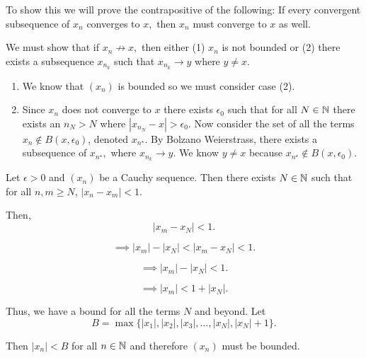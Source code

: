 \documentclass{report}
\begin{document}
\bigskip
{}

\begin{myproof}
  To show this we will prove the contrapositive of the following: If every convergent subsequence of $x_n$ converges to $x,$ then  $x_n$ must converge to $x$ as well. 

We must show that if $x_n \not\rightarrow x,$ then either (1) $x_n$ is not bounded or (2) there exists a subsequence $x_{n_k}$ such that $x_{n_k} \rightarrow y$ where $y \not= x.$

\begin{enumerate}
  \item We know that $(x_n)$ is bounded so we must consider case (2).
  \item Since $x_n$ does not converge to $x$ there exists $\epsilon_0$ such that for all $N \in \NN$ there exists an $n_N > N$ where $|x_{n_N} - x| > \epsilon_0.$  Now consider the set of all the terms $x_n \not\in B(x,\epsilon_0)$, denoted $x_{n^\star}.$ By Bolzano Weierstrass, there exists a subsequence of $x_{n^\star},$ where $x_{n_k} \rightarrow y.$ We know  $y \not=x$ because $x_{n^\star} \not\in  B(x,\epsilon_0).$

\end{enumerate}
\end{myproof}
\bigskip
\bigskip
{}

Let $\epsilon >0$ and $(x_n)$ be a Cauchy sequence. Then there exists $N \in \NN$ such that for all $n,m \geq N$, $\left| x_n - x_m\right| < 1.$ 

Then, 
 $$ \left|x_m - x_N\right| < 1.$$

$$ \implies \left| x_m \right| - \left|x_N\right| < \left| x_m - x_N\right| < 1.$$


$$ \implies \left| x_m \right| - \left|x_N\right|  < 1.$$

$$ \implies \left| x_m \right| < 1 + \left|x_N\right|.$$


Thus, we have a bound for all the terms $N$ and beyond. Let $$ B = \max\{|x_1|, |x_2|, |x_3|, \dots, |x_N|, |x_N| + 1\}.$$

Then $|x_n| < B$ for all $n \in \NN$ and therefore $(x_n)$ must be bounded.
\end{document}
